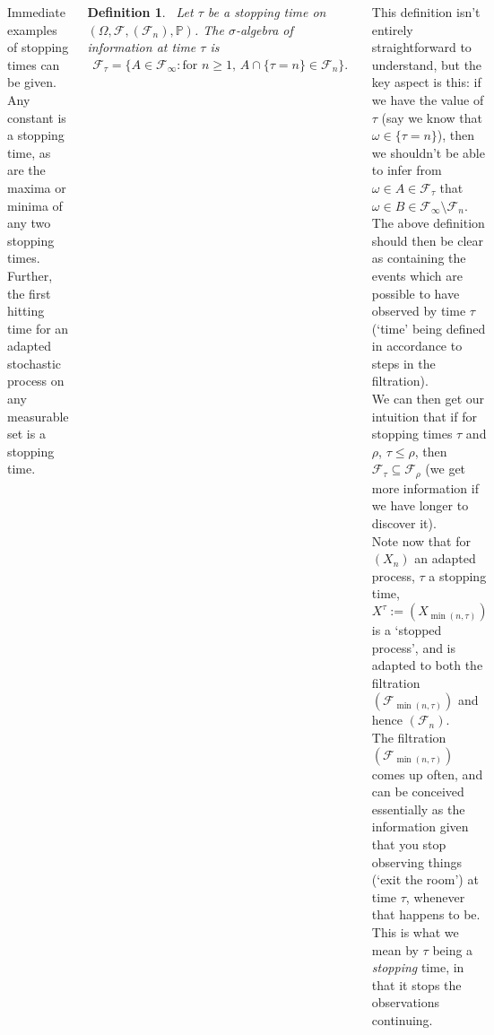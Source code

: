 \documentclass{tikzposter} %
\newtheorem{definition}{Definition}
\begin{document}
\begin{columns}
{    Immediate examples of stopping times can be given. Any constant is a stopping time, as are the maxima or minima of any two stopping times. Further, the first hitting time for an adapted stochastic process on any measurable set is a stopping time. \\

    \begin{definition}
    \ Let $\tau$ be a stopping time on $(\Omega, \mathcal{F}, (\mathcal{F}_{n}), \mathbb{P})$. The $\sigma$-algebra of information at time $\tau$ is
    \begin{align*}
      \mathcal{F}_{\tau} = \{A \in \mathcal{F}_{\infty} : \text{for } n \ge 1,\,A \cap \{\tau = n\} \in \mathcal{F}_{n}\}.
    \end{align*}
    \end{definition}

    This definition isn't entirely straightforward to understand, but the key aspect is this: if we have the value of $\tau$ (say we know that $\omega \in \{\tau = n\}$), then we shouldn't be able to infer from $\omega \in A \in \mathcal{F}_{\tau}$ that $\omega \in B \in \mathcal{F}_{\infty} \setminus \mathcal{F}_{n}$. The above definition should then be clear as containing the events which are possible to have observed by time $\tau$ (`time' being defined in accordance to steps in the filtration).\\

    We can then get our intuition that if for stopping times $\tau$ and $\rho$, $\tau \le \rho$, then $\mathcal{F}_{\tau} \subseteq \mathcal{F}_{\rho}$ (we get more information if we have longer to discover it). \\

    Note now that for $(X_{n})$ an adapted process, $\tau$ a stopping time, $X^{\tau} := (X_{\min(n,\tau)})$ is a `stopped process', and is adapted to both the filtration $(\mathcal{F}_{\min(n,\tau)})$ and hence $(\mathcal{F}_n)$. \\

    The filtration $(\mathcal{F}_{\min(n,\tau)})$ comes up often, and can be conceived essentially as the information given that you stop observing things (`exit the room') at time $\tau$, whenever that happens to be. This is what we mean by $\tau$ being a \emph{stopping} time, in that it stops the observations continuing.
  }
\end{columns}
\end{document}
